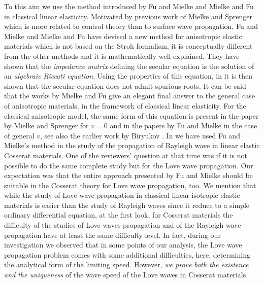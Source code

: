 \documentclass[10pt]{article}
\begin{document}
  
 To this aim we use the method introduced by Fu and Mielke \cite{fu2002new} and Mielke and Fu \cite{mielke2004uniqueness} in classical linear elasticity.
Motivated by  previous work of Mielke and Sprenger \cite{mielke1998quasiconvexity} which is more related to  control theory \cite{knobloch2012topics} than to surface wave propagation, Fu and Mielke \cite{fu2002new} and Mielke and Fu \cite{mielke2004uniqueness} have devised a new method for anisotropic elastic materials which is not based on the Stroh formalism, it is conceptually different from the other methods   and it is mathematically  well explained. They have shown that the {\it impedance matrix} \cite{ingebrigtsen1969elastic} defining the secular equation is the solution of an \textit{algebraic Riccati equation}. Using the properties of this equation, in \cite{mielke2004uniqueness,fu2002new} it is then  {shown} that   the secular equation does not admit spurious roots. It can be  said that the works by Mielke and Fu give an elegant final  answer to the general case of anisotropic materials, in the framework of classical linear elasticity. For the classical anisotropic model, the same form of this equation is present in the paper by Mielke  and Sprenger \cite{mielke1998quasiconvexity}  for $v=0$ and in the papers by Fu and Mielke \cite{mielke2004uniqueness,fu2002new} in the case of general $v$, see also the earlier work by Biryukov \cite{biryukov1985impedance}. 
 In \cite{khan2022existence} we have used  Fu and Mielke's method \cite{fu2002new,mielke2004uniqueness} in the study of the propagation of Rayleigh wave in linear elastic Cosserat  materials.  One of the reviewers' question at that time was if it is not possible to do the  {same} complete study but for the Love wave propagation. Our expectation was that the entire approach presented  by Fu and Mielke \cite{mielke2004uniqueness,fu2002new} should be suitable in the Cosserat theory for Love wave propagation, too. We mention that while the study of Love wave propagation in classical linear isotropic elastic materials is easier than the study of  {Rayleigh} waves since it reduce to a simple ordinary differential equation, at the first look, for Cosserat materials the difficulty of the studies of Love waves propagation and of the Rayleigh wave propagation have at least the same difficulty level. In fact, during our  {investigation} we  {observed} that in some points of our analysis, the Love wave propagation problem comes with some additional difficulties,  {here, determining} the analytical form of the limiting speed. However,  {\it we prove both the existence and the uniqueness} of the wave speed of the Love waves in Cosserat materials. 
\end{document}
